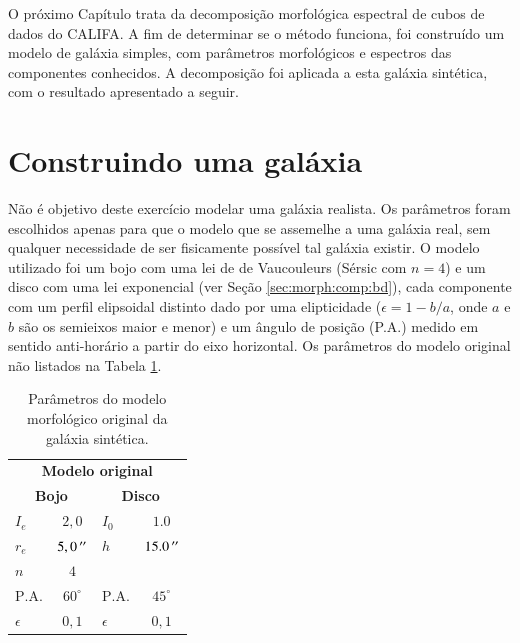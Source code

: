 O próximo Capítulo trata da decomposição morfológica espectral de cubos de dados
do CALIFA. A fim de determinar se o método funciona, foi construído um modelo de
galáxia simples, com parâmetros morfológicos e espectros das componentes
conhecidos. A decomposição foi aplicada a esta galáxia sintética, com o
resultado apresentado a seguir.

\section{Construindo uma galáxia}

Não é objetivo deste exercício modelar uma galáxia realista. Os parâmetros foram
escolhidos apenas para que o modelo que se assemelhe a uma galáxia real, sem
qualquer necessidade de ser fisicamente possível tal galáxia existir. O modelo
utilizado foi um bojo com uma lei de de Vaucouleurs (Sérsic com $n=4$) e um
disco com uma lei exponencial (ver Seção \ref{sec:morph:comp:bd}), cada
componente com um perfil elipsoidal distinto dado por uma elipticidade
($\epsilon = 1 - b/a$, onde $a$ e $b$ são os semieixos maior e menor) e um
ângulo de posição (P.A.) medido em sentido anti-horário a partir do eixo
horizontal. Os parâmetros do modelo original não listados na Tabela
\ref{tab:testeModeloOriginal}.

\begin{table}
\begin{tabular}{ l  c | l  c }
  \hline
  \multicolumn{4}{c}{\textbf{Modelo original}} \\
  \multicolumn{2}{c}{\textbf{Bojo}} & \multicolumn{2}{c}{\textbf{Disco}} \\
  \hline
  $I_e$ & $2,0$ & $I_0$ & $1.0$ \\
  $r_e$ & $5,0\,^{\prime\prime}$ & $h$ & $15.0\,^{\prime\prime}$ \\
  $n$ & $4$ & & \\
  $\mathrm{P.A.}$ & $60^\circ$ & $\mathrm{P.A.}$ & $45^\circ$ \\
  $\epsilon$ & $0,1$ & $\epsilon$ & $0,1$ \\
  \hline
\end{tabular}
\caption[Modelo morfológico original da galáxia sintética]
{Parâmetros do modelo morfológico original da galáxia sintética.}
\label{tab:testeModeloOriginal}
\end{table}

